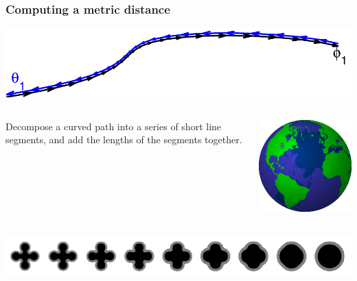 \begin{frame}
\frametitle{Computing a metric distance}
\includegraphics[width=\textwidth]{trajectory0}\par
\begin{columns}[c]
Decompose a curved path into a series of short line segments, and add the lengths of the segments together.\par
{}
\includegraphics[width=\textwidth]{Globe}
\end{columns}
\includegraphics[width=\textwidth]{series2}
\end{frame}


